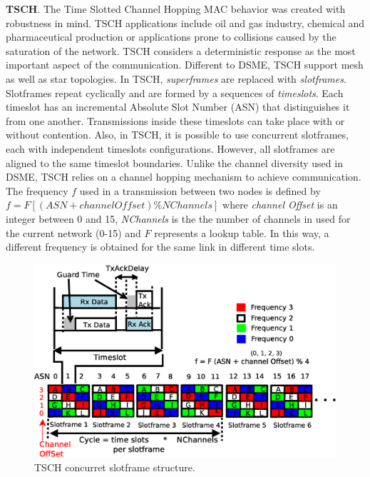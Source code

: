 \documentclass[conference]{IEEEtran}
\begin{document}
\textbf{TSCH}. The Time Slotted Channel Hopping MAC behavior was created with robustness in mind. TSCH applications include oil and gas industry, chemical and pharmaceutical production or applications prone to collisions caused by the saturation of the network. TSCH considers a deterministic response as the most important aspect of the communication. Different to DSME, TSCH support mesh as well as star topologies. In TSCH, \textit{superframes} are replaced with \textit{slotframes}. Slotframes repeat cyclically and are formed by a sequences of \textit{timeslots}. Each timeslot has an incremental Absolute Slot Number (ASN) that distinguishes it from one another. Transmissions inside these timeslots can take place with or without contention. Also, in TSCH, it is possible to use concurrent slotframes, each with independent timeslots configurations. However, all slotframes are aligned to the same timeslot boundaries.
Unlike the channel diversity used in DSME, TSCH relies on a channel hopping mechanism to achieve communication.
The frequency $f$ used in a transmission between two nodes is defined by \mbox{$f= F[(ASN+ channel Offset) \% NChannels]$} where \textit{channel Offset} is an integer between 0 and 15, \textit{NChannels} is the the number of channels in used for the current network (0-15) and $F$ represents a lookup table. In this way, a different frequency is obtained for the same link in different time slots.
\begin{figure}[!htb]
\centering
\includegraphics[scale=.28]{tschSlotframe}
\caption{TSCH concurret slotframe structure.}
\label{fig:tschSlotframe}
\end{figure}
\end{document}
